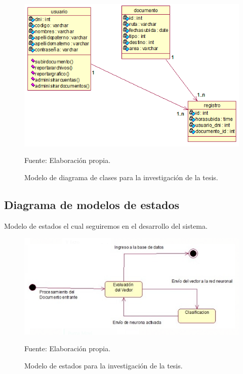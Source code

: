 \begin{figure}[h!]
	\centering
		\includegraphics[scale=0.7]{imagenes/diagramadeClases22.png}
		\caption{Modelo de diagrama de clases para la investigación de la tesis.}
	\begin{center}
    Fuente: Elaboración propia.
    \end{center}
	\label{fig:diagramaClasesTesis}
\end{figure}
\newpage
\subsection{Diagrama de modelos de estados}
Modelo de estados el cual seguiremos en el desarrollo del sistema.

\begin{figure}[h!]
	\centering
		\includegraphics[scale=0.7]{imagenes/ModeloEstado.png}
		\caption{Modelo de estados para la investigación de la tesis.}
	\begin{center}
    Fuente: Elaboración propia.
    \end{center}
	\label{fig:ModeloEstado}
\end{figure}

